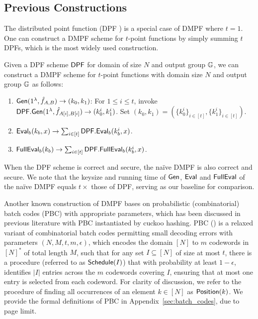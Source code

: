 \subsection{Previous Constructions}

The distributed point function (DPF \cite{10.1007/978-3-662-46803-6_12,BoyGilIsh16}) is a special case of DMPF where $t=1$. 
One can construct a DMPF scheme for $t$-point functions by simply summing $t$ DPFs, which is the most widely used construction.  
\begin{construction}\label{con:naive_DMPF}
  Given a DPF scheme ${\sf DPF}$ for domain of size $N$ and output group $\mathbb{G}$, we can construct a DMPF scheme for $t$-point functions with domain size $N$ and output group $\mathbb{G}$ as follows: 
  \begin{enumerate}[itemsep = 5pt]
    \item ${\sf Gen}(1^\lambda, \hat{f}_{A, B})\rightarrow (k_0, k_1)$: For $1\le i\le t$, invoke ${\sf DPF}.{\sf Gen}(1^\lambda, \hat{f}_{A[i], B[i]})\rightarrow (k_0^i, k_1^i)$. Set $(k_0, k_1) = (\{k_0^i\}_{i\in [t]}, \{k_1^i\}_{i\in [t]})$. 
    \item ${\sf Eval}_b(k_b, x)\rightarrow \sum_{i\in [t]}{\sf DPF}.{\sf Eval}_b(k_b^i, x)$. 
    \item ${\sf FullEval}_b(k_b)\rightarrow  \sum_{i\in [t]}{\sf DPF}.{\sf FullEval}_b(k_b^i, x)$. 
  \end{enumerate}
\end{construction}
When the DPF scheme is correct and secure, the na\"ive DMPF is also correct and secure. We note that the keysize and running time of ${\sf Gen}$, ${\sf Eval}$ and ${\sf FullEval}$ of the na\"ive DMPF equals $t\times $ those of DPF, serving as our baseline for comparison. 

Another known construction of DMPF bases on probabilistic (combinatorial) batch codes (PBC) with appropriate parameters, which has been discussed in previous literature \cite{cryptoeprint:2019/273,cryptoeprint:2019/1084,cryptoeprint:2021/580,foleage} with PBC instantiated by cuckoo hashing. PBC (\cite{cryptoeprint:2017/1142,10.1145/1007352.1007396,cryptoeprint:2022/1455}) is a relaxed variant of combinatorial batch codes permitting small decoding errors with parameters $(N,M,t,m,\epsilon)$, which encodes the domain $[N]$ to $m$ codewords in $[N]^*$ of total length $M$, such that for any set $I\subseteq [N]$ of size at most $t$, there is a procedure (referred to as ${\sf Schedule}(I)$) that with probability at least $1-\epsilon$, identifies $|I|$ entries across the $m$ codewords covering $I$, ensuring that at most one entry is selected from each codeword. For clarity of discussion, we refer to the procedure of finding all occurrences of an element $k\in[N]$ as ${\sf Position}(k)$. We provide the formal definitions of PBC in Appendix~\ref{sec:batch_codes}, due to page limit.  

